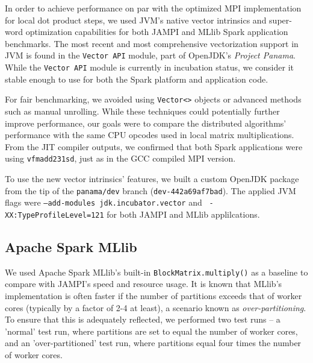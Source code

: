 \documentclass[fleqn,10pt]{SelfArx} %
\begin{document}
In order to achieve performance on par with the optimized MPI implementation for local dot product steps, we used JVM's native vector intrinsics and super-word optimization capabilities for both JAMPI and MLlib Spark application benchmarks. The most recent and most comprehensive vectorization support in JVM is found in the \texttt{Vector API} module, part of OpenJDK's \emph{Project Panama}. While the \texttt{Vector API} module is currently in incubation status, we consider it stable enough to use for both the Spark platform and application code.

For fair benchmarking, we avoided using \texttt{Vector<>} objects or advanced methods such as manual unrolling. While these techniques could potentially further improve performance, our goals were to compare the distributed algorithms' performance with the same CPU opcodes used in local matrix multiplications. From the JIT compiler outputs, we confirmed that both Spark applications were using \texttt{vfmadd231sd}, just as in the GCC compiled MPI version.

To use the new vector intrinsics' features, we built a custom OpenJDK package from the tip of the \texttt{panama/dev} branch (\texttt{dev-442a69af7bad}). The applied JVM flags were \texttt{--add-modules jdk.incubator.vector} and \texttt{ -XX:TypeProfileLevel=121} for both JAMPI and MLlib applilcations. 



\subsection{Apache Spark MLlib}

We used Apache Spark MLlib's built-in \texttt{BlockMatrix.multiply()} as a baseline to compare with JAMPI's speed and resource usage. It is known that MLlib's implementation is often faster if the number of partitions exceeds that of worker cores (typically by a factor of 2-4 at least), a scenario known as \emph{over-partitioning}. To ensure that this is adequately reflected, we performed two test runs – a 'normal' test run, where partitions are set to equal the number of worker cores, and an 'over-partitioned' test run, where partitions equal four times the number of worker cores.
\end{document}
